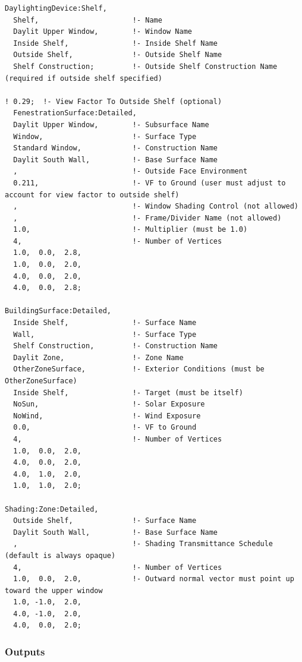 \begin{lstlisting}
DaylightingDevice:Shelf,
  Shelf,                      !- Name
  Daylit Upper Window,        !- Window Name
  Inside Shelf,               !- Inside Shelf Name
  Outside Shelf,              !- Outside Shelf Name
  Shelf Construction;         !- Outside Shelf Construction Name (required if outside shelf specified)

! 0.29;  !- View Factor To Outside Shelf (optional)
  FenestrationSurface:Detailed,
  Daylit Upper Window,        !- Subsurface Name
  Window,                     !- Surface Type
  Standard Window,            !- Construction Name
  Daylit South Wall,          !- Base Surface Name
  ,                           !- Outside Face Environment
  0.211,                      !- VF to Ground (user must adjust to account for view factor to outside shelf)
  ,                           !- Window Shading Control (not allowed)
  ,                           !- Frame/Divider Name (not allowed)
  1.0,                        !- Multiplier (must be 1.0)
  4,                          !- Number of Vertices
  1.0,  0.0,  2.8,
  1.0,  0.0,  2.0,
  4.0,  0.0,  2.0,
  4.0,  0.0,  2.8;

BuildingSurface:Detailed,
  Inside Shelf,               !- Surface Name
  Wall,                       !- Surface Type
  Shelf Construction,         !- Construction Name
  Daylit Zone,                !- Zone Name
  OtherZoneSurface,           !- Exterior Conditions (must be OtherZoneSurface)
  Inside Shelf,               !- Target (must be itself)
  NoSun,                      !- Solar Exposure
  NoWind,                     !- Wind Exposure
  0.0,                        !- VF to Ground
  4,                          !- Number of Vertices
  1.0,  0.0,  2.0,
  4.0,  0.0,  2.0,
  4.0,  1.0,  2.0,
  1.0,  1.0,  2.0;

Shading:Zone:Detailed,
  Outside Shelf,              !- Surface Name
  Daylit South Wall,          !- Base Surface Name
  ,                           !- Shading Transmittance Schedule (default is always opaque)
  4,                          !- Number of Vertices
  1.0,  0.0,  2.0,            !- Outward normal vector must point up toward the upper window
  1.0, -1.0,  2.0,
  4.0, -1.0,  2.0,
  4.0,  0.0,  2.0;
\end{lstlisting}

\subsubsection{Outputs}\label{outputs-3-002}

